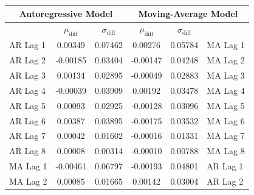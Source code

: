 \documentclass[oneside,12pt,openany]{book}
\begin{document}
		\begin{table}[!ht]
			\centering
			\begin{tabular}{|l|c|c|c|c|l|}
				\hline
				\multicolumn{3}{|c|}{\textbf{Autoregressive Model}}   & \multicolumn{3}{c|}{\textbf{Moving-Average Model}}  \\ \hline
                \cellcolor{black} & $\mu_{\text{diff}}$ & $\sigma_{\text{diff}}$ & $\mu_{\text{diff}}$ & $\sigma_{\text{diff}}$ & \cellcolor{black}         \\ \hline
				AR Lag 1 & 0.00349                  & 0.07462                    & 0.00276                  & 0.05784                    & MA Lag 1 \\ \hline
				AR Lag 2 & -0.00185                 & 0.03404                    & -0.00147                 & 0.04248                    & MA Lag 2 \\ \hline
				AR Lag 3 & 0.00134                  & 0.02895                    & -0.00049                 & 0.02883                    & MA Lag 3 \\ \hline
				AR Lag 4 & -0.00039                 & 0.03909                    & 0.00192                  & 0.03478                    & MA Lag 4 \\ \hline
				AR Lag 5 & 0.00093                  & 0.02925                    & -0.00128                 & 0.03096                    & MA Lag 5 \\ \hline
				AR Lag 6 & 0.00387                  & 0.03895                    & -0.00175                 & 0.03532                    & MA Lag 6 \\ \hline
				AR Lag 7 & 0.00042                  & 0.01602                    & -0.00016                 & 0.01331                    & MA Lag 7 \\ \hline
				AR Lag 8 & 0.00008                  & 0.00314                    & -0.00010                 & 0.00788                    & MA Lag 8 \\ \hline
				MA Lag 1 & -0.00461                 & 0.06797                    & -0.00193                 & 0.04801                    & AR Lag 1 \\ \hline
				MA Lag 2 & 0.00085                  & 0.01665                    & 0.00142                  & 0.03004                    & AR Lag 2 \\ \hline
			\end{tabular}
		\end{table}
	
\end{document}
